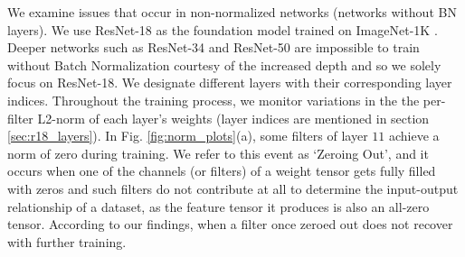 \documentclass[runningheads]{llncs}
\begin{document}
We examine issues that occur in non-normalized networks (networks without BN layers). We
use ResNet-18 \cite{he2016deep} as the foundation model trained on ImageNet-1K
\cite{russakovsky2015imagenet}. Deeper networks such as ResNet-34 and ResNet-50 are
impossible to train without Batch Normalization courtesy of the increased depth and so
we solely focus on ResNet-18. We designate different layers with their corresponding
layer indices. Throughout the training process, we monitor variations in the the
per-filter L2-norm of each layer's weights (layer indices are mentioned in section
\ref{sec:r18_layers}). In Fig. \ref{fig:norm_plots}(a), some filters of layer $11$
achieve a norm of zero during training. We refer to this event as `Zeroing Out', and it
occurs when one of the channels (or filters) of a weight tensor gets fully filled with
zeros and such filters do not contribute at all to determine the input-output
relationship of a dataset, as the feature tensor it produces is also an all-zero tensor.
According to our findings, when a filter once zeroed out does not recover with further
training. 
\end{document}
